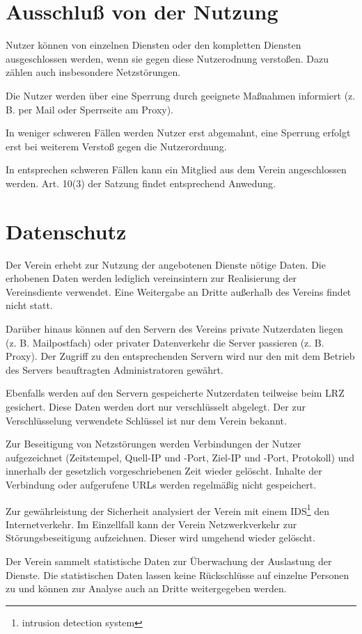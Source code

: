 \documentclass[a4paper,10pt]{scrartcl}
\begin{document}
\section{Ausschluß von der Nutzung}
Nutzer können von einzelnen Diensten oder den kompletten Diensten ausgeschlossen werden, wenn sie gegen diese Nutzerodnung verstoßen. Dazu zählen auch insbesondere Netzstörungen.

Die Nutzer werden über eine Sperrung durch geeignete Maßnahmen informiert (z. B. per Mail oder Sperrseite am Proxy).

In weniger schweren Fällen werden Nutzer erst abgemahnt, eine Sperrung erfolgt erst bei weiterem Verstoß gegen die Nutzerordnung.

In entsprechen schweren Fällen kann ein Mitglied aus dem Verein angeschlossen werden. Art. 10(3) der Satzung findet entsprechend Anwedung. 

\section{Datenschutz}
Der Verein erhebt zur Nutzung der angebotenen Dienste nötige Daten. Die erhobenen Daten werden lediglich vereinsintern zur Realisierung der Vereinsdiente verwendet. Eine Weitergabe an Dritte außerhalb des Vereins findet nicht statt.

Darüber hinaus können auf den Servern des Vereins private Nutzerdaten liegen (z. B. Mailpostfach) oder privater Datenverkehr die Server passieren (z. B. Proxy). Der Zugriff zu den entsprechenden Servern wird nur den mit dem Betrieb des Servers beauftragten Administratoren gewährt.

Ebenfalls werden auf den Servern gespeicherte Nutzerdaten teilweise beim LRZ gesichert. Diese Daten werden dort nur verschlüsselt abgelegt. Der zur Verschlüsselung verwendete Schlüssel ist nur dem Verein bekannt.

Zur Beseitigung von Netzstörungen werden Verbindungen der Nutzer aufgezeichnet (Zeitstempel, Quell-IP und -Port, Ziel-IP und -Port, Protokoll) und innerhalb der gesetzlich vorgeschriebenen Zeit wieder gelöscht. Inhalte der Verbindung oder aufgerufene URLs werden regelmäßig nicht gespeichert.

Zur gewährleistung der Sicherheit analysiert der Verein mit einem IDS\footnote{intrusion detection system} den Internetverkehr. Im Einzellfall kann der Verein Netzwerkverkehr zur Störungsbeseitigung aufzeichnen. Dieser wird umgehend wieder gelöscht.

Der Verein sammelt statistische Daten zur Überwachung der Auslastung der Dienste. Die statistischen Daten lassen keine Rückschlüsse auf einzelne Personen zu und können zur Analyse auch an Dritte weitergegeben werden.
\end{document}
